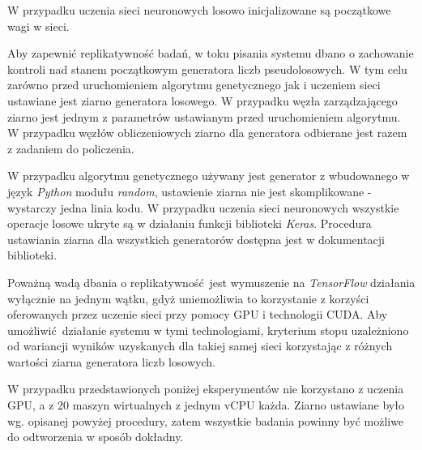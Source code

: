 W przypadku uczenia sieci neuronowych losowo inicjalizowane są początkowe wagi w sieci.

Aby zapewnić replikatywność badań, w toku pisania systemu dbano o zachowanie kontroli nad stanem początkowym generatora liczb pseudolosowych.
W tym celu zarówno przed uruchomieniem algorytmu genetycznego jak i uczeniem sieci ustawiane jest ziarno generatora losowego.
W przypadku węzła zarządzającego ziarno jest jednym z parametrów ustawianym przed uruchomieniem algorytmu.
W przypadku węzłów obliczeniowych ziarno dla generatora odbierane jest razem z zadaniem do policzenia.

W przypadku algorytmu genetycznego używany jest generator z wbudowanego w język \textit{Python} modułu \textit{random}, ustawienie ziarna nie jest skomplikowane - wystarczy jedna linia kodu.
W przypadku uczenia sieci neuronowych wszystkie operacje losowe ukryte są w działaniu funkcji biblioteki \textit{Keras}.
Procedura ustawiania ziarna dla wszystkich generatorów dostępna jest w dokumentacji biblioteki. \cite{chollet2015keras}

Poważną wadą dbania o replikatywność jest wymuszenie na \textit{TensorFlow} działania wyłącznie na jednym wątku, gdyż uniemożliwia to korzystanie z korzyści oferowanych przez uczenie sieci przy pomocy GPU i technologii CUDA.
Aby umożliwić działanie systemu w tymi technologiami, kryterium stopu uzależniono od wariancji wyników uzyskanych dla takiej samej sieci korzystając z różnych wartości ziarna generatora liczb losowych.

W przypadku przedstawionych poniżej eksperymentów nie korzystano z uczenia GPU, a z 20 maszyn wirtualnych z jednym vCPU każda.
Ziarno ustawiane było wg. opisanej powyżej procedury, zatem wszystkie badania powinny być możliwe do odtworzenia w sposób dokładny.
